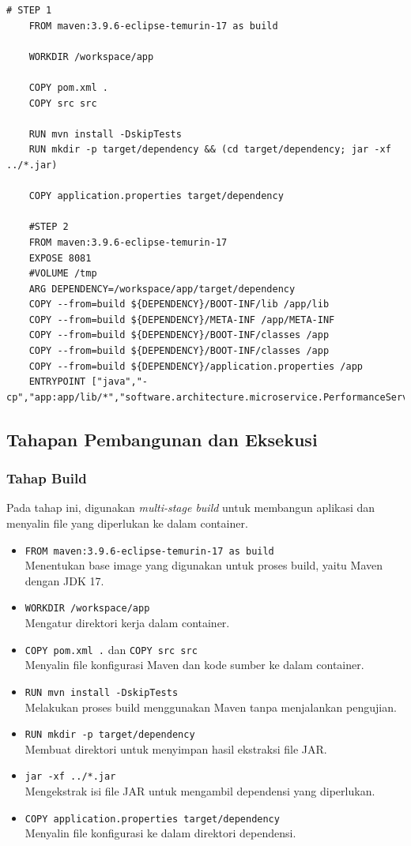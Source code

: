 \begin{lstlisting}[language=docker]
	# STEP 1
	FROM maven:3.9.6-eclipse-temurin-17 as build
	
	WORKDIR /workspace/app
	
	COPY pom.xml .
	COPY src src
	
	RUN mvn install -DskipTests
	RUN mkdir -p target/dependency && (cd target/dependency; jar -xf ../*.jar)
	
	COPY application.properties target/dependency
	
	#STEP 2
	FROM maven:3.9.6-eclipse-temurin-17
	EXPOSE 8081
	#VOLUME /tmp
	ARG DEPENDENCY=/workspace/app/target/dependency
	COPY --from=build ${DEPENDENCY}/BOOT-INF/lib /app/lib
	COPY --from=build ${DEPENDENCY}/META-INF /app/META-INF
	COPY --from=build ${DEPENDENCY}/BOOT-INF/classes /app
	COPY --from=build ${DEPENDENCY}/BOOT-INF/classes /app
	COPY --from=build ${DEPENDENCY}/application.properties /app
	ENTRYPOINT ["java","-cp","app:app/lib/*","software.architecture.microservice.PerformanceServiceApplication"]
\end{lstlisting}

\subsection{Tahapan Pembangunan dan Eksekusi}

\subsubsection{Tahap Build}
Pada tahap ini, digunakan \textit{multi-stage build} untuk membangun aplikasi dan menyalin file yang diperlukan ke dalam container.

\begin{itemize}
	\item \texttt{FROM maven:3.9.6-eclipse-temurin-17 as build} \\
	Menentukan base image yang digunakan untuk proses build, yaitu Maven dengan JDK 17.
	\item \texttt{WORKDIR /workspace/app} \\
	Mengatur direktori kerja dalam container.
	\item \texttt{COPY pom.xml .} dan \texttt{COPY src src} \\
	Menyalin file konfigurasi Maven dan kode sumber ke dalam container.
	\item \texttt{RUN mvn install -DskipTests} \\
	Melakukan proses build menggunakan Maven tanpa menjalankan pengujian.
	\item \texttt{RUN mkdir -p target/dependency} \\
	Membuat direktori untuk menyimpan hasil ekstraksi file JAR.
	\item \texttt{jar -xf ../*.jar} \\
	Mengekstrak isi file JAR untuk mengambil dependensi yang diperlukan.
	\item \texttt{COPY application.properties target/dependency} \\
	Menyalin file konfigurasi ke dalam direktori dependensi.
\end{itemize}

